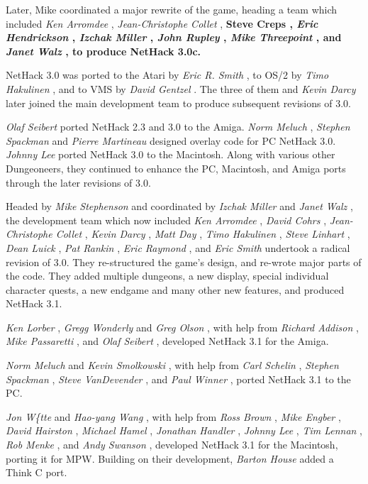 Later, Mike coordinated a major rewrite of the game, heading a
team which included %
{\it Ken Arromdee}%
, %
{\it Jean-Christophe Collet}%
, %
\bf Steve
Creps\rm%
, %
{\it Eric Hendrickson}%
, %
{\it Izchak Miller}%
, %
{\it John Rupley}%
,
%
{\it Mike Threepoint}%
, and %
{\it Janet Walz}%
, to produce NetHack 3.0c.

NetHack 3.0 was ported to the Atari by %
{\it Eric R. Smith}%
, to OS/2 by
%
{\it Timo Hakulinen}%
, and to VMS by %
{\it David Gentzel}%
.  The three of them
and %
{\it Kevin Darcy}%
later joined the main development team to produce
subsequent revisions of 3.0.

%
{\it Olaf Seibert}%
ported NetHack 2.3 and 3.0 to the Amiga.
%
{\it Norm Meluch}%
, %
{\it Stephen Spackman}%
and %
{\it Pierre Martineau}%
designed
overlay code for PC NetHack 3.0.  %
{\it Johnny Lee}%
ported
NetHack 3.0 to the Macintosh.  Along with various other Dungeoneers, they
continued to enhance the PC, Macintosh, and Amiga ports through the later
revisions of 3.0.

Headed by %
{\it Mike Stephenson}%
and coordinated by %
{\it Izchak Miller}%
and
%
{\it Janet Walz}%
, the development team which now included %
{\it Ken Arromdee}%
,
%
{\it David Cohrs}%
, %
{\it Jean-Christophe Collet}%
, %
{\it Kevin Darcy}%
,
%
{\it Matt Day}%
, %
{\it Timo Hakulinen}%
, %
{\it Steve Linhart}%
, %
{\it Dean Luick}%
,
%
{\it Pat Rankin}%
, %
{\it Eric Raymond}%
, and %
{\it Eric Smith}%
undertook a radical
revision of 3.0.  They re-structured the game's design, and re-wrote major
parts of the code.  They added multiple dungeons, a new display, special
individual character quests, a new endgame and many other new features, and
produced NetHack 3.1.

%
{\it Ken Lorber}%
, %
{\it Gregg Wonderly}%
and %
{\it Greg Olson}%
, with help
from %
{\it Richard Addison}%
, %
{\it Mike Passaretti}%
, and %
{\it Olaf Seibert}%
,
developed NetHack 3.1 for the Amiga.

%
{\it Norm Meluch}%
and %
{\it Kevin Smolkowski}%
, with help from
%
{\it Carl Schelin}%
, %
{\it Stephen Spackman}%
, %
{\it Steve VanDevender}%
,
and %
{\it Paul Winner}%
, ported NetHack 3.1 to the PC.

%
{\it Jon W\{tte}%
and %
{\it Hao-yang Wang}%
, with help from %
{\it Ross Brown}%
,
%
{\it Mike Engber}%
, %
{\it David Hairston}%
, %
{\it Michael Hamel}%
,
%
{\it Jonathan Handler}%
, %
{\it Johnny Lee}%
, %
{\it Tim Lennan}%
, %
{\it Rob Menke}%
,
and %
{\it Andy Swanson}%
, developed NetHack 3.1 for the Macintosh,
porting it for MPW.  Building on their development, %
{\it Barton House}%
added a Think C port.

